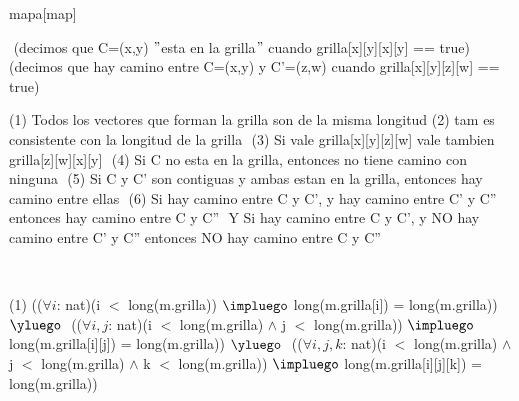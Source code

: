 \begin{Representacion}

\begin{Estructura}{mapa}[map]
	\begin{Tupla}[map]  
  	\end{Tupla}
  	
\end{Estructura}


$ $ $ $\newline
(decimos que C=(x,y) $"$esta en la grilla$"$ cuando grilla[x][y][x][y] == true) $ $\newline
(decimos que hay camino entre C=(x,y) y C'=(z,w) cuando grilla[x][y][z][w] == true) $ $\newline

(1) Todos los vectores que forman la grilla son de la misma longitud$ $\newline
(2) tam es consistente con la longitud de la grilla $ $\newline
(3) Si vale grilla[x][y][z][w] vale tambien grilla[z][w][x][y] $ $\newline
(4) Si C no esta en la grilla, entonces no tiene camino con ninguna $ $\newline
(5) Si C y C' son contiguas y ambas estan en la grilla, entonces hay camino entre ellas $ $\newline
(6) Si hay camino entre C y C', y hay camino entre C' y C'' entonces hay camino entre C y C'' $ $\newline
Y Si hay camino entre C y C', y NO hay camino entre C' y C'' entonces NO hay camino entre C y C'' $ $\newline


$ $\newline
$ $\newline

(1)
(($\forall i$: nat)(i $<$ long(m.grilla)) $\impluego$ long(m.grilla[i]) = long(m.grilla)) $\yluego$ $ $\newline
(($\forall i, j$: nat)(i $<$ long(m.grilla) $\land$ j $<$ long(m.grilla)) $\impluego$ long(m.grilla[i][j]) = long(m.grilla)) $\yluego$ $ $\newline
(($\forall i, j, k$: nat)(i $<$ long(m.grilla) $\land$ j $<$ long(m.grilla) $\land$ k $<$ long(m.grilla)) $\impluego$ $ $\newline long(m.grilla[i][j][k]) = long(m.grilla))


\end{Representacion}
